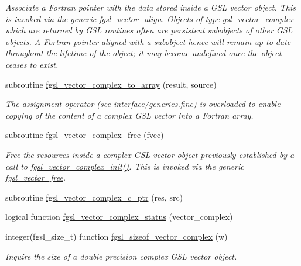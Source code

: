 \begin{DoxyCompactItemize}
\begin{DoxyCompactList}\small\item\em Associate a Fortran pointer with the data stored inside a G\-S\-L vector object. This is invoked via the generic \hyperlink{interfacefgsl__vector__align}{fgsl\-\_\-vector\-\_\-align}. Objects of type {\ttfamily gsl\-\_\-vector\-\_\-complex} which are returned by G\-S\-L routines often are persistent subobjects of other G\-S\-L objects. A Fortran pointer aligned with a subobject hence will remain up-\/to-\/date throughout the lifetime of the object; it may become undefined once the object ceases to exist. \end{DoxyCompactList}\item 
subroutine \hyperlink{array_8finc_ad9bc465224323cc4ecdcf56589bdfdbb}{fgsl\-\_\-vector\-\_\-complex\-\_\-to\-\_\-array} (result, source)
\begin{DoxyCompactList}\small\item\em The assignment operator (see \hyperlink{generics_8finc}{interface/generics.\-finc}) is overloaded to enable copying of the content of a complex G\-S\-L vector into a Fortran array. \end{DoxyCompactList}\item 
subroutine \hyperlink{array_8finc_a3a8d76f2fe0bb4c9687f06e5e33671b8}{fgsl\-\_\-vector\-\_\-complex\-\_\-free} (fvec)
\begin{DoxyCompactList}\small\item\em Free the resources inside a complex G\-S\-L vector object previously established by a call to \hyperlink{array_8finc_a71c83c0b1de4b3965b6b8d6efb28cf13}{fgsl\-\_\-vector\-\_\-complex\-\_\-init()}. This is invoked via the generic \hyperlink{interfacefgsl__vector__free}{fgsl\-\_\-vector\-\_\-free}. \end{DoxyCompactList}\item 
subroutine \hyperlink{array_8finc_a07419ff1eb431e5a8bf628d31099e9a7}{fgsl\-\_\-vector\-\_\-complex\-\_\-c\-\_\-ptr} (res, src)
\item 
logical function \hyperlink{array_8finc_a04dbf95001922f560a73333ca3d00f81}{fgsl\-\_\-vector\-\_\-complex\-\_\-status} (vector\-\_\-complex)
\item 
integer(fgsl\-\_\-size\-\_\-t) function \hyperlink{array_8finc_af8cb8c5be9be9e6604200da0845dc18d}{fgsl\-\_\-sizeof\-\_\-vector\-\_\-complex} (w)
\begin{DoxyCompactList}\small\item\em Inquire the size of a double precision complex G\-S\-L vector object. \end{DoxyCompactList}\item 

\end{DoxyCompactItemize}

